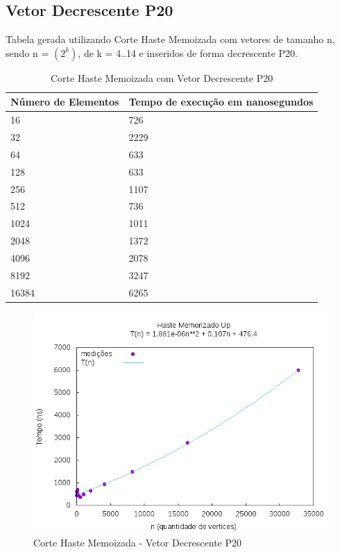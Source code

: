 \documentclass[12pt,a4paper,twoside]{report}
\begin{document}
\subsection{Vetor Decrescente P20}
Tabela gerada utilizando Corte Haste Memoizada com vetores de tamanho n, sendo n = $(2^k)$, de k = 4..14 e inseridos de forma decrescente P20.
\begin{table}[H]
\centering
\caption{Corte Haste Memoizada com Vetor Decrescente P20}
\label{my-label}
\begin{tabular}{|l|l|}
\hline
\multicolumn{1}{|c|}{\textbf{Número de Elementos}} & \multicolumn{1}{c|}{\textbf{Tempo de execução em nanosegundos}} \\ \hline
16 & 726 \\ \hline
32 & 2229 \\ \hline
64 & 633 \\ \hline
128 & 633 \\ \hline
256 & 1107 \\ \hline
512 & 736 \\ \hline
1024 & 1011 \\ \hline
2048 & 1372 \\ \hline
4096 & 2078 \\ \hline
8192 & 3247 \\ \hline
16384 & 6265 \\ \hline

\end{tabular}
\end{table}

\begin{figure}[H]
    \centering
    \includegraphics[width=0.7\linewidth]{graficos/CorteHasteMemorizado/Decrescente P20/HasteMemo.png}
  \caption{Corte Haste Memoizada - Vetor Decrescente P20}
\end{figure}
\end{document}
